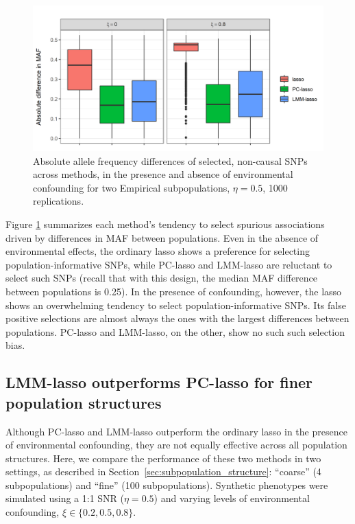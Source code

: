 \begin{figure}[hbt]
\centering
\includegraphics[scale = 0.9]{figures/pop_inf_snps_box.png}
\caption{Absolute allele frequency differences of selected, non-causal SNPs across methods, in the presence and absence of environmental confounding for two Empirical subpopulations, $\eta = 0.5$, 1000 replications.}
\label{fig:pop_inf}
\end{figure}

Figure \ref{fig:pop_inf} summarizes each method's tendency to select spurious associations driven by differences in MAF between populations.  Even in the absence of environmental effects, the ordinary lasso shows a preference for selecting population-informative SNPs, while PC-lasso and LMM-lasso are reluctant to select such SNPs (recall that with this design, the median MAF difference between populations is 0.25).  In the presence of confounding, however, the lasso shows an overwhelming tendency to select population-informative SNPs.  Its false positive selections are almost always the ones with the largest differences between populations.  PC-lasso and LMM-lasso, on the other, show no such such selection bias.


\subsection{LMM-lasso outperforms PC-lasso for finer population structures}
\label{sec:sim-fine-coarse}

Although PC-lasso and LMM-lasso outperform the ordinary lasso in the presence of environmental confounding, they are not equally effective across all population structures.  Here, we compare the performance of these two methods in two settings, as described in Section~\ref{sec:subpopulation_structure}: ``coarse'' (4 subpopulations) and ``fine'' (100 subpopulations).  Synthetic phenotypes were simulated using a 1:1 SNR ($\eta = 0.5$) and varying levels of environmental confounding, $\xi \in \{0.2, 0.5,0.8\}$. 

